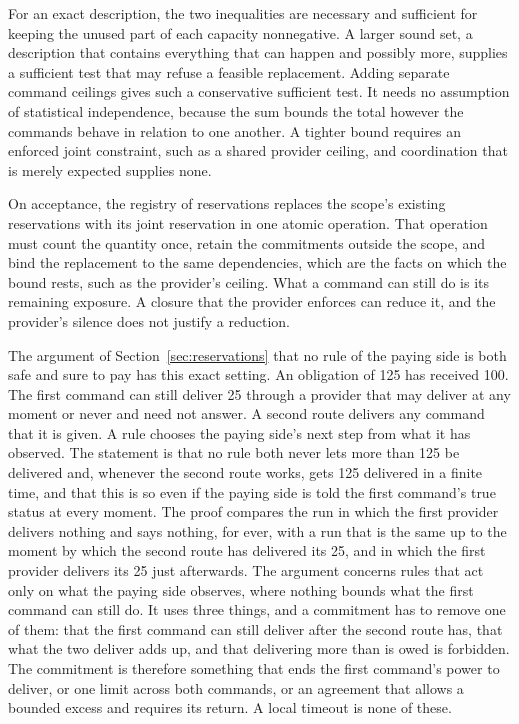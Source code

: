 \documentclass{momentum}
\begin{document}
For an exact description, the two inequalities are necessary and sufficient for keeping the unused part of each capacity nonnegative. A larger sound set, a description that contains everything that can happen and possibly more, supplies a sufficient test that may refuse a feasible replacement. Adding separate command ceilings gives such a conservative sufficient test. It needs no assumption of statistical independence, because the sum bounds the total however the commands behave in relation to one another. A tighter bound requires an enforced joint constraint, such as a shared provider ceiling, and coordination that is merely expected supplies none.

On acceptance, the registry of reservations replaces the scope's existing reservations with its joint reservation in one atomic operation. That operation must count the quantity once, retain the commitments outside the scope, and bind the replacement to the same dependencies, which are the facts on which the bound rests, such as the provider's ceiling. What a command can still do is its remaining exposure. A closure that the provider enforces can reduce it, and the provider's silence does not justify a reduction.

The argument of Section~\ref{sec:reservations} that no rule of the paying side is both safe and sure to pay has this exact setting. An obligation of 125 has received 100. The first command can still deliver 25 through a provider that may deliver at any moment or never and need not answer. A second route delivers any command that it is given. A rule chooses the paying side's next step from what it has observed. The statement is that no rule both never lets more than 125 be delivered and, whenever the second route works, gets 125 delivered in a finite time, and that this is so even if the paying side is told the first command's true status at every moment. The proof compares the run in which the first provider delivers nothing and says nothing, for ever, with a run that is the same up to the moment by which the second route has delivered its 25, and in which the first provider delivers its 25 just afterwards. The argument concerns rules that act only on what the paying side observes, where nothing bounds what the first command can still do. It uses three things, and a commitment has to remove one of them: that the first command can still deliver after the second route has, that what the two deliver adds up, and that delivering more than is owed is forbidden. The commitment is therefore something that ends the first command's power to deliver, or one limit across both commands, or an agreement that allows a bounded excess and requires its return. A local timeout is none of these.
\end{document}
